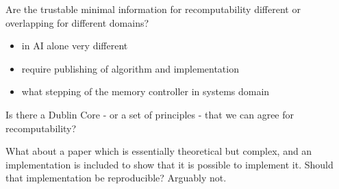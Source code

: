 \documentclass[a4paper,11pt]{article}
\begin{document}

Are the trustable minimal information for recomputability  different or overlapping for different domains?
\begin{itemize}
\item in AI alone very different
\item require publishing of algorithm and implementation
\item what stepping of the memory controller in systems domain
\end{itemize}

Is there a Dublin Core - or a set of principles - that we can agree for recomputability?

What about a paper which is essentially theoretical but complex, and an implementation is included to show that it is possible to implement it. Should that implementation be reproducible? Arguably not.



%
%
\end{document}
